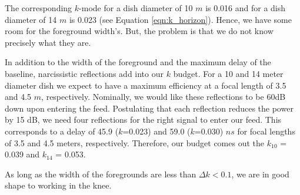 \documentclass[11pt]{article}
\begin{document}
The corresponding $k$-mode for a dish diameter of 10 $m$ is 0.016 and for a dish
diameter of 14 $m$ is 0.023 (see Equation \ref{eqn:k_horizon}). Hence, we have
some room for the foreground width's. But, the problem is that we do not know
precisely what they are. 

In addition to the width of the foreground and the maximum delay of the
baseline, narcissistic reflections add into our $k$ budget. For a 10 and 14
meter diameter dish we expect to have a maximum efficiency at a focal length of
3.5 and 4.5 $m$, respectively. Nominally, we would like these reflections to be
60dB down upon entering the feed. Postulating that each reflection reduces the
power by 15 dB, we need four reflections for the right signal to enter our feed.
This corresponds to a delay of 45.9 ($k$=0.023)  and 59.0 ($k$=0.030) $ns$ for
focal lengths of 3.5 and 4.5 meters, respectively. Therefore, our budget comes
out the $k_{10}$ = 0.039 and $k_{14}$ = 0.053.

As long as the width of the foregrounds are less than $\Delta k < 0.1$, we are
in good shape to working in the knee. 
\end{document}
